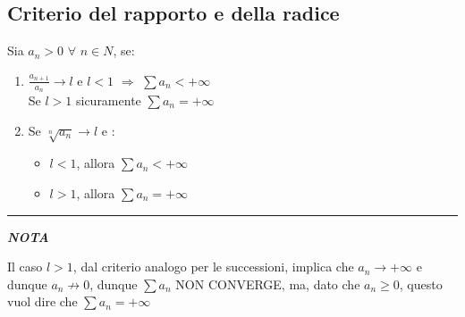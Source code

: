 \documentclass{article}
\theoremstyle{definition}
\begin{document}
\subsection{Criterio del rapporto e della radice}
Sia $a_n > 0 \,\, \forall \,\, n \in N$, se:
\begin{enumerate}
    \item $\frac{a_{n+1}}{a_n} \to l$ e $l < 1 \,\, \Longrightarrow \,\, \sum a_n < +\infty$
    \\
    Se $l > 1$ sicuramente $\sum a_n = +\infty$
    \item Se $\sqrt[n]{a_n} \to l$ e :
    \begin{itemize}
        \item $l < 1$, allora $\sum a_n < +\infty$
        \item $l > 1$, allora $\sum a_n = +\infty$
    \end{itemize}
\end{enumerate}
\vspace{15pt}
\hrule
\vspace{15pt}
\begin{center}
    \textbf{\textit{NOTA}}
\end{center}
Il caso $l > 1$, dal criterio analogo per le successioni, implica che $a_n \to + \infty$ e dunque $a_n \nrightarrow 0$, dunque $\sum a_n$ NON CONVERGE, ma, dato che $a_n \geqslant 0$, questo vuol dire che $\sum a_n = +\infty$
\end{document}
